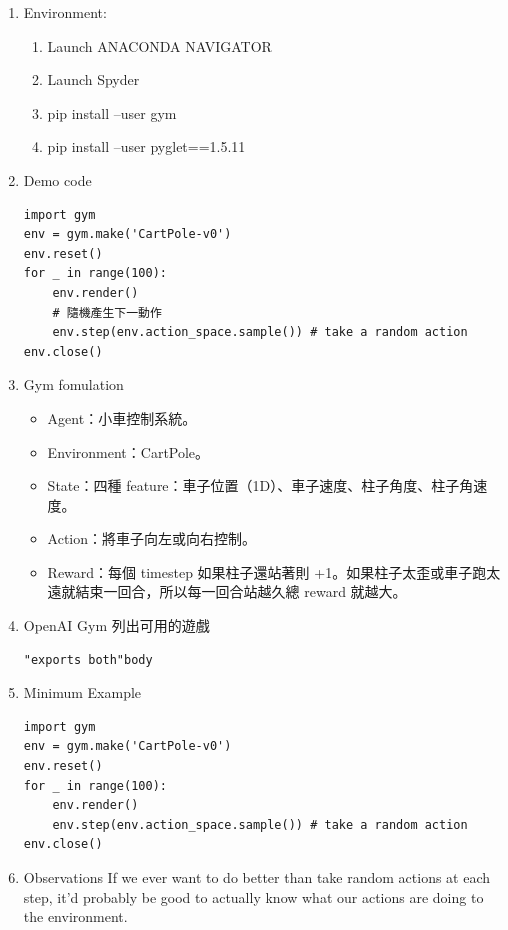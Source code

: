 \documentclass[a4paper,12pt]{article}
\begin{document}
\begin{enumerate}
簡單來說OpenAI Gym提供了許多問題和環境（或遊戲）的接口，而用戶無需過多瞭解遊戲的內部實現，通過簡單地調用就可以用來測試和仿真。\\
\item Environment:
\label{sec:orgd506456}
\begin{enumerate}
\item Launch ANACONDA NAVIGATOR\\
\item Launch Spyder\\
\item pip install --user gym\\
\item pip install --user pyglet==1.5.11\\
\end{enumerate}
\item Demo code
\label{sec:org16f1a43}
\lstset{breaklines=true,language=Python,label= ,caption= ,captionpos=b,firstnumber=1,numbers=left}
\begin{lstlisting}
import gym
env = gym.make('CartPole-v0')
env.reset()
for _ in range(100):
    env.render()
    # 隨機產生下一動作
    env.step(env.action_space.sample()) # take a random action
env.close()
\end{lstlisting}
\item Gym fomulation
\label{sec:org54ba465}
\begin{itemize}
\item Agent：小車控制系統。\\
\item Environment：CartPole。\\
\item State：四種 feature：車子位置（1D）、車子速度、柱子角度、柱子角速度。\\
\item Action：將車子向左或向右控制。\\
\item Reward：每個 timestep 如果柱子還站著則 +1。如果柱子太歪或車子跑太遠就結束一回合，所以每一回合站越久總 reward 就越大。\\
\end{itemize}
\item OpenAI Gym
\label{sec:org3bb93c0}
列出可用的遊戲\\
\lstset{breaklines=true,language="exports,label= ,caption= ,captionpos=b,numbers=none}
\begin{lstlisting}
"exports both"body
\end{lstlisting}
\item Minimum Example
\label{sec:org8c3b00a}
\lstset{breaklines=true,language=Python,label= ,caption= ,captionpos=b,firstnumber=1,numbers=left}
\begin{lstlisting}
import gym
env = gym.make('CartPole-v0')
env.reset()
for _ in range(100):
    env.render()
    env.step(env.action_space.sample()) # take a random action
env.close()
\end{lstlisting}
\item Observations
\label{sec:org88861d1}
If we ever want to do better than take random actions at each step, it’d probably be good to actually know what our actions are doing to the environment.\\


\end{enumerate}
\end{document}
